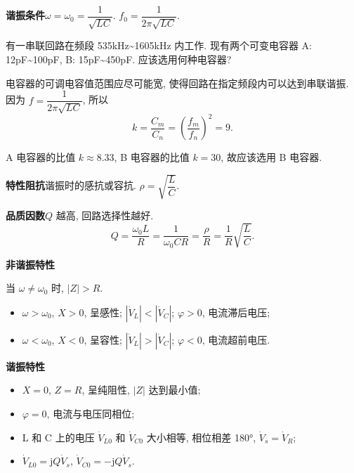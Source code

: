 \textbf{谐振条件}\quad $\omega=\omega_0=\dfrac{1}{\sqrt{LC}}$. $f_0=\dfrac{1}{2\pi\sqrt{LC}}$.

\begin{exampleprob}
    有一串联回路在频段 535kHz\textasciitilde 1605kHz 内工作. 现有两个可变电容器 A: 12pF\textasciitilde 100pF, B: 15pF\textasciitilde 450pF. 应该选用何种电容器?

    \begin{solution}
        电容器的可调电容值范围应尽可能宽, 使得回路在指定频段内可以达到串联谐振. 因为 $f=\dfrac{1}{2\pi\sqrt{LC}}$, 所以
        \begin{equation*}
            k=\frac{C_m}{C_n}=\left(\frac{f_m}{f_n}\right)^2=9.
        \end{equation*}

        A 电容器的比值 $k\approx 8.33$, B 电容器的比值 $k=30$, 故应该选用 B 电容器.
    \end{solution}
\end{exampleprob}

\textbf{特性阻抗}\quad 谐振时的感抗或容抗. $\rho=\sqrt{\dfrac{L}{C}}$.

\textbf{品质因数}\quad $Q$ 越高, 回路选择性越好.
\begin{equation}
    Q=\frac{\omega_0L}{R}=\frac{1}{\omega_0CR}=\frac{\rho}{R}=\frac{1}{R}\sqrt{\dfrac{L}{C}}.
\end{equation}

\textbf{非谐振特性}

当 $\omega\neq\omega_0$ 时, $|Z|>R$.

\begin{itemize}
    \item $\omega>\omega_0$, $X>0$, 呈感性; $|\dot{V}_L|<|\dot{V}_C|$; $\varphi>0$, 电流滞后电压;
    \item $\omega<\omega_0$, $X<0$, 呈容性; $|\dot{V}_L|>|\dot{V}_C|$; $\varphi<0$, 电流超前电压.
\end{itemize}

\textbf{谐振特性}

\begin{itemize}
    \item $X=0$, $Z=R$, 呈纯阻性, $|Z|$ 达到最小值;
    \item $\varphi=0$, 电流与电压同相位;
    \item L 和 C 上的电压 $\dot{V}_{L0}$ 和 $\dot{V}_{C0}$ 大小相等, 相位相差 180°, $\dot{V}_s=\dot{V}_R$;
    \item $\dot{V}_{L0}=\mathrm{j}Q\dot{V}_s$, $\dot{V}_{C0}=-\mathrm{j}Q\dot{V}_s$.
\end{itemize}


